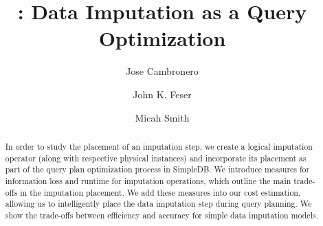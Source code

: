 \documentclass{article}
\title{\ProjectName{}: Data Imputation as a Query Optimization}
\author{
  Jose Cambronero \\
  \and
  John K. Feser
  \and
  Micah Smith}
\begin{document}
\maketitle

\begin{abstract}
In order to study the placement of an imputation step, we create a logical imputation operator (along with respective physical instances) and incorporate its placement as part of the query plan optimization process in SimpleDB.  We introduce measures for information loss and runtime for imputation operations, which outline the main trade-offs in the imputation placement. We add these measures into our cost estimation, allowing us to intelligently place the data imputation step during query planning. We show the trade-offs between efficiency and accuracy for simple data imputation models. \end{abstract}








\printbibliography
\end{document}
